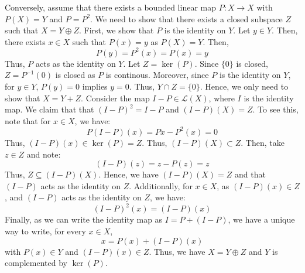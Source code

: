 \documentclass[12pt]{article}
\begin{document}
\begin{solution}
    Conversely, assume that there exists a bounded linear map $P: X \to X$ with $P(X) = Y$ and $P = P^2$. We need to show that there exists a closed subspace $Z$ such that $X = Y \oplus Z$. \bbni
    First, we show that $P$ is the identity on $Y$. Let $y \in Y$. Then, there exists $x \in X$ such that $P(x) = y$ as $P(X) = Y$. Then, 
    \[ P(y) = P^2(x) = P(x) = y\]
    Thus, $P$ acts as the identity on $Y$. \bbni 
    Let $Z = \ker(P)$. Since $\{0\}$ is closed, $Z = P^{-1}(0)$ is closed as $P$ is continous. Moreover, since $P$ is the identity on $Y$, for $y \in Y$, $P(y) = 0$ implies $y = 0$. Thus, $Y \cap Z = \{0\}$. Hence, we only need to show that $X = Y + Z$.  \bbni    
    Consider the map $I-P \in \mathcal L(X)$, where $I$ is the identity map. We claim that that $(I-P)^2 = I-P$ and $(I-P)(X) = Z$. To see this, note that for $x \in X$, we have:
    \[ P(I-P)(x) = Px-P^2(x) = 0 \]
    Thus, $(I-P)(x) \in \ker(P) = Z$. Thus, $(I-P)(X) \subset Z$. Then, take $z \in Z$ and note: 
    \[ (I-P)(z) = z-P(z) = z\]
    Thus, $Z \subseteq (I-P)(X)$. Hence, we have $(I-P)(X) = Z$ and that $(I-P)$ acts as the identity on $Z$. \bbni
    Additionally, for $x \in X$, as $(I-P)(x) \in Z$, and $(I-P)$ acts as the identity on $Z$, we have: 
    \[ (I-P)^2(x) = (I-P)(x)\]
    Finally, as we can write the identity map as $I = P + (I-P)$, we have a unique way to write, for every $x \in X$, 
    \[ x = P(x) + (I-P)(x)\]
    with $P(x) \in Y$ and $(I-P)(x) \in Z$. Thus, we have $X = Y \oplus Z$ and $Y$ is complemented by $\ker(P)$.    
\end{solution}
\newpage
\end{document}
